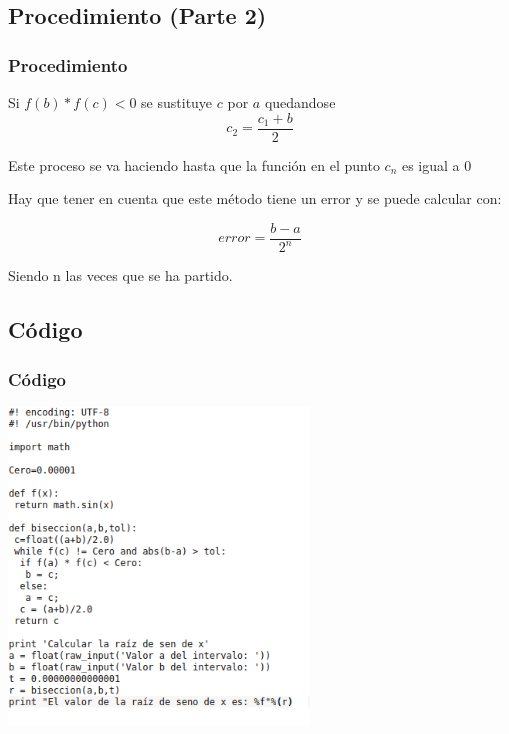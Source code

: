 \documentclass{beamer}
\begin{document}

\subsection{Procedimiento (Parte 2)}
\begin{frame}
\frametitle{Procedimiento}
\begin{block}
 \item
  Si $f(b)*f(c)<0$ se sustituye $c$ por $a$ quedandose $$c_2=\frac{c_1+b}{2}$$
 \pause
 \item
  Este proceso se va haciendo hasta que la función en el punto $c_n$ es igual a $0$
 \pause
 \item
  Hay que tener en cuenta que este método tiene un error y se puede calcular con:
 \begin{center}
  $$ error=\frac{b-a}{2^n} $$ 
 \end{center} 
  Siendo n las veces que se ha partido. \end{block}
 
\end{frame}


\subsection{Código} 
\begin{frame}[fragile]

\frametitle{Código}
\begin{center}
\includegraphics[width=0.6\textwidth]{xcgc.png} 
\end{center}
\end{frame}
\end{document}

